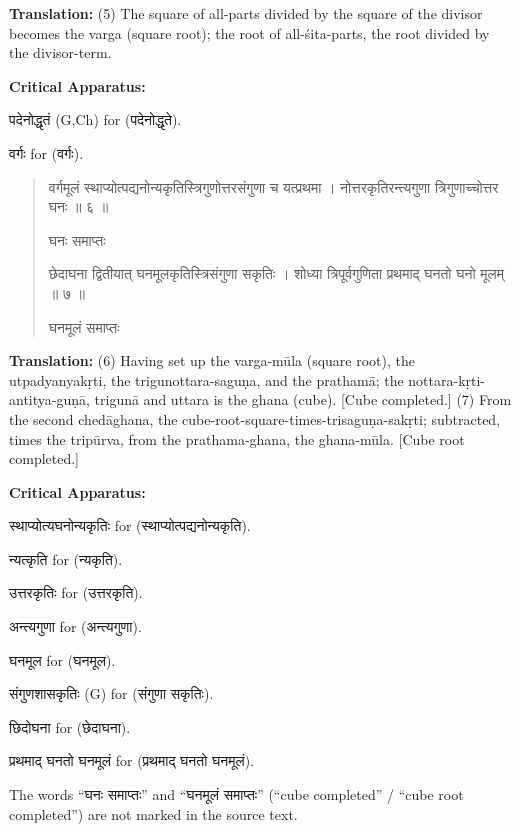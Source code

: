 \documentclass[11pt,a4paper]{article}
\newcommand{\dev}[1]{{\devanagarifont #1}}
\newenvironment{sanskritverse}{%
  \begin{quote}%
  \devanagarifont%
  \setlength{\leftmargin}{2em}%
}{\end{quote}}
\newenvironment{variants}{%
  \small%
  \color{varecolor}%
  \list{}{\leftmargin=2em\itemindent=-1em}%
}{\endlist}
\begin{document}
\textbf{Translation:} (5) The square of all-parts divided by the square of the 
divisor becomes the varga (square root); the root of all-śita-parts, the root 
divided by the divisor-term.

\textcolor{varecolor}{\textbf{Critical Apparatus:}}
\begin{variants}
\item[5.1] \dev{पदेनोद्धृतं} (G,Ch) \dev{for} (\dev{पदेनोद्धृते}).
\item[5.2] \dev{वर्गः} \dev{for} (\dev{वर्गः}).
\end{variants}

\begin{sanskritverse}
\dev{वर्गमूलं स्थाप्योत्पद्यनोन्यकृतिस्त्रिगुणोत्तरसंगुणा च यत्प्रथमा} ।
\dev{नोत्तरकृतिरन्त्यगुणा त्रिगुणाच्चोत्तर घनः ॥ ६ ॥}

\dev{घनः समाप्तः}

\dev{छेदाघना द्वितीयात् घनमूलकृतिस्त्रिसंगुणा सकृतिः} ।
\dev{शोध्या त्रिपूर्वगुणिता प्रथमाद् घनतो घनो मूलम् ॥ ७ ॥}

\dev{घनमूलं समाप्तः}
\end{sanskritverse}

\textbf{Translation:} (6) Having set up the varga-mūla (square root), the utpadyanyakṛti, 
the trigunottara-saguṇa, and the prathamā; the nottara-kṛti-antitya-guṇā, trigunā 
and uttara is the ghana (cube). [Cube completed.] (7) From the second chedāghana, 
the cube-root-square-times-trisaguṇa-sakṛti; subtracted, times the tripūrva, 
from the prathama-ghana, the ghana-mūla. [Cube root completed.]

\textcolor{varecolor}{\textbf{Critical Apparatus:}}
\begin{variants}
\item[6.1] \dev{स्थाप्योत्यघनोन्यकृतिः} \dev{for} (\dev{स्थाप्योत्पद्यनोन्यकृति}).
\item[6.2] \dev{न्यत्कृति} \dev{for} (\dev{न्यकृति}).
\item[6.3] \dev{उत्तरकृतिः} \dev{for} (\dev{उत्तरकृति}).
\item[6.4] \dev{अन्त्यगुणा} \dev{for} (\dev{अन्त्यगुणा}).
\item[7.1] \dev{घनमूल} \dev{for} (\dev{घनमूल}).
\item[7.2] \dev{संगुणशासकृतिः} (G) \dev{for} (\dev{संगुणा सकृतिः}).
\item[7.3] \dev{छिदोघना} \dev{for} (\dev{छेदाघना}).
\item[7.4] \dev{प्रथमाद् घनतो घनमूलं} \dev{for} (\dev{प्रथमाद् घनतो घनमूलं}).
\item[\dev{वि०}] The words ``\dev{घनः समाप्तः}'' and ``\dev{घनमूलं समाप्तः}'' 
(``cube completed'' / ``cube root completed'') are not marked in the source text.
\end{variants}
\end{document}
